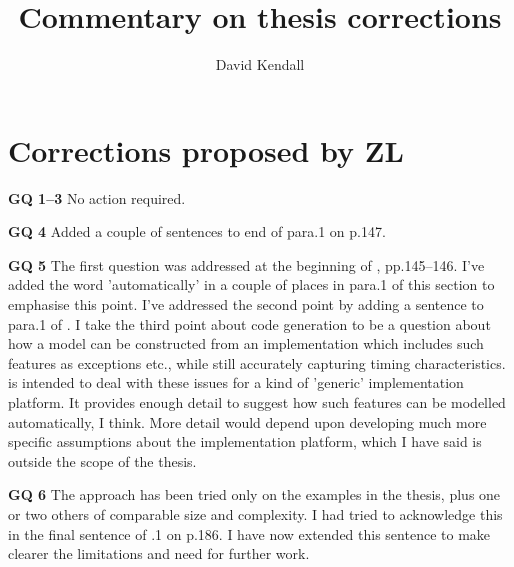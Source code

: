 \documentclass{article}
\title{Commentary on thesis corrections}
\author{David Kendall}
\begin{document}
\maketitle
\section{Corrections proposed by ZL}
\begin{trivlist}
\item[\bf GQ 1--3] No action required.
\item[\bf GQ 4] Added a couple of sentences to end of para.1 on p.147.
\item[\bf GQ 5] The first question was addressed at the beginning of
, pp.145--146. I've added the word 'automatically' in a couple
of places in para.1 of this section to emphasise this point. I've
addressed the second point by adding a sentence to para.1 of
. I take the third point about code generation to be a question
about how a model can be constructed from an implementation which
includes such features as exceptions etc., while still accurately
capturing timing characteristics.  is intended to deal with
these issues for a kind of 'generic' implementation platform. It
provides enough detail to suggest how such features can be modelled
automatically, I think. More detail would depend upon developing much
more specific assumptions about the implementation platform, which I
have said is outside the scope of the thesis.
\item[\bf GQ 6] The approach has been tried only on the examples in the
thesis, plus one or two others of comparable size and complexity. I
had tried to acknowledge this in the final sentence of .1 on p.186. I
have now extended this sentence to make clearer the limitations and
need for further work.
\end{trivlist}
\end{document}
